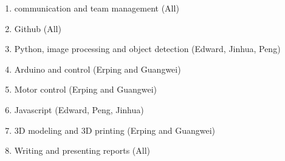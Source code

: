 \documentclass[12pt]{article}
\begin{document}
\begin{enumerate}
  \item communication and team management (All)
  \item Github (All)
  \item Python, image processing and object detection (Edward, Jinhua, Peng)
  \item Arduino and control (Erping and Guangwei)
  \item Motor control (Erping and Guangwei)
  \item Javascript (Edward, Peng, Jinhua)
  \item 3D modeling and 3D printing (Erping and Guangwei)
  \item Writing and presenting reports (All)
\end{enumerate}
\end{document}
